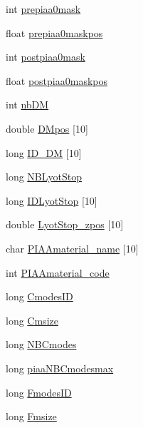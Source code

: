 \begin{DoxyCompactItemize}
\item 
int \hyperlink{structOPTPIAACMCDESIGN_a4f424ef8e93fc3f0a89c37a9c5972820}{prepiaa0mask}
\item 
float \hyperlink{structOPTPIAACMCDESIGN_a4f6c7b87f374eefda6c212329be7ba43}{prepiaa0maskpos}
\item 
int \hyperlink{structOPTPIAACMCDESIGN_a392b32b63ba511bff062e98c941814aa}{postpiaa0mask}
\item 
float \hyperlink{structOPTPIAACMCDESIGN_a5fb317d6c29f6d774462ae4f6b6c3e09}{postpiaa0maskpos}
\item 
int \hyperlink{structOPTPIAACMCDESIGN_abcbc2dfd1fde61c341f2689b1ed810dd}{nb\+D\+M}
\item 
double \hyperlink{structOPTPIAACMCDESIGN_ad508d17e469e18e4d2d8034bf0f23ea6}{D\+Mpos} \mbox{[}10\mbox{]}
\item 
long \hyperlink{structOPTPIAACMCDESIGN_a01002138c2aeb8f60ce18ab70bac6a15}{I\+D\+\_\+\+D\+M} \mbox{[}10\mbox{]}
\item 
long \hyperlink{structOPTPIAACMCDESIGN_aacf0223dec146b41ded13305b83c8ba6}{N\+B\+Lyot\+Stop}
\item 
long \hyperlink{structOPTPIAACMCDESIGN_a58b78571969e6a7a7d33a1439f264889}{I\+D\+Lyot\+Stop} \mbox{[}10\mbox{]}
\item 
double \hyperlink{structOPTPIAACMCDESIGN_ac58466d4fb98041f6a1279ce0e1092b1}{Lyot\+Stop\+\_\+zpos} \mbox{[}10\mbox{]}
\item 
char \hyperlink{structOPTPIAACMCDESIGN_abf3280f1ad15a23b5cf9f05942ca6d69}{P\+I\+A\+Amaterial\+\_\+name} \mbox{[}10\mbox{]}
\item 
int \hyperlink{structOPTPIAACMCDESIGN_a9fc6f0b8de4e0e7fe0694cd8f4e827e1}{P\+I\+A\+Amaterial\+\_\+code}
\item 
long \hyperlink{structOPTPIAACMCDESIGN_a34261c3f4264eb64be04cacd186aa1fc}{Cmodes\+I\+D}
\item 
long \hyperlink{structOPTPIAACMCDESIGN_a0943c7f88d6cc19f0d93aec976c33abf}{Cmsize}
\item 
long \hyperlink{structOPTPIAACMCDESIGN_a8206d0c4c019d9c2a6dda4d22cf7d8a6}{N\+B\+Cmodes}
\item 
long \hyperlink{structOPTPIAACMCDESIGN_a8fbed9f02c0a17dcc2f233be4c4af697}{piaa\+N\+B\+Cmodesmax}
\item 
long \hyperlink{structOPTPIAACMCDESIGN_a6b13c1628f90db964d8279de9aee4f23}{Fmodes\+I\+D}
\item 
long \hyperlink{structOPTPIAACMCDESIGN_a0e84939f7dbafe942bc7725bd6ddfa8e}{Fmsize}
\item 

\end{DoxyCompactItemize}
